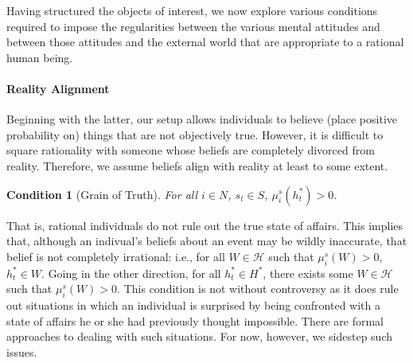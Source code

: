 \documentclass[
11pt,
titlepage,
reqno,
]{article}%
\newtheorem{condition}{Condition}
\theoremstyle{definition}
\begin{document}
	Having structured the objects of interest, we now explore various conditions required to impose the regularities between the various mental attitudes and between those attitudes and the external world that are appropriate to a rational human being. 
	
	\paragraph{Reality Alignment\label{para: reality alignment}} 
	Beginning with the latter, our setup allows individuals to believe (place positive probability on) things that are not objectively true. 
	However, it is difficult to square rationality with someone whose beliefs are completely divorced from reality. 
	Therefore, we assume beliefs align with reality at least to some extent.
	\begin{condition}[Grain of Truth]\label{cond:grain of truth}
		For all $i\in N$, $s_t\in S$, $\mu_i^s(h^\ast_t)>0$.
	\end{condition}
	\noindent That is, rational individuals do not rule out the true state of affairs. 
	This implies that, although an indivual's beliefs about an event may be wildly inaccurate, that belief is not completely irrational: i.e., for all $W\in \mathcal{H}$ such that $\mu_i^s(W)>0$, $h^\ast_t\in W$. 
	Going in the other direction, for all $h^\ast_t\in H^\ast$, there exists some $W\in \mathcal{H}$ such that $\mu_i^s(W)>0$.
	This condition is not without controversy as it does rule out situations in which an individual is surprised by being confronted with a state of affairs he or she had previously thought impossible.
	There are formal approaches to dealing with such situations.
	For now, however, we sidestep such issues.
	
\end{document}
